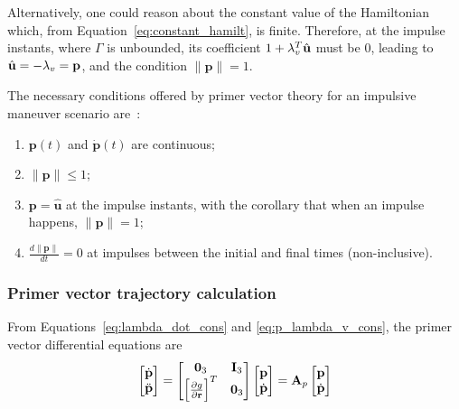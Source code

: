 Alternatively, one could reason about the constant value of the Hamiltonian which, from Equation~\eqref{eq:constant_hamilt}, is finite. Therefore, at the impulse instants, where \(\Gamma\) is unbounded, its coefficient \(1 + \lambda_v^T \hat{\mathbf{u}}\) must be \(0\), leading to \(\hat{\mathbf{u}} = -\lambda_v = \mathbf{p}\), and the condition \(\lVert \mathbf{p} \rVert = 1\).

The necessary conditions offered by primer vector theory for an impulsive maneuver scenario are~\cite{Conway_2010}:
\begin{enumerate}
    \item \(\mathbf{p}(t)\) and \(\dot{\mathbf{p}}(t)\) are continuous;
    \item \(\lVert \mathbf{p} \rVert \leq 1\);
    \item \(\mathbf{p} = \hat{\mathbf{u}}\) at the impulse instants, with the corollary that when an impulse happens, \(\lVert \mathbf{p} \rVert = 1\);
    \item \(\frac{d \lVert \mathbf{p} \rVert}{dt} = 0\) at impulses between the initial and final times (non-inclusive).
\end{enumerate}

\subsubsection{Primer vector trajectory calculation}

From Equations~\eqref{eq:lambda_dot_cons} and \eqref{eq:p_lambda_v_cons}, the primer vector differential equations are
\begin{equation}\label{eq:pdot_const}
    \begin{bmatrix}
        \dot{\mathbf{p}} \\ \ddot{\mathbf{p}}
    \end{bmatrix} = \begin{bmatrix}
        \mathbf{0}_3 & \mathbf{I}_3 \\
        \left[\frac{\partial g}{\partial \pos}\right]^T & \mathbf{0}_3
    \end{bmatrix} \begin{bmatrix}
        \mathbf{p} \\ \dot{\mathbf{p}}
    \end{bmatrix} = \mathbf{A}_p \begin{bmatrix}
        \mathbf{p} \\ \dot{\mathbf{p}}
    \end{bmatrix}
\end{equation}

